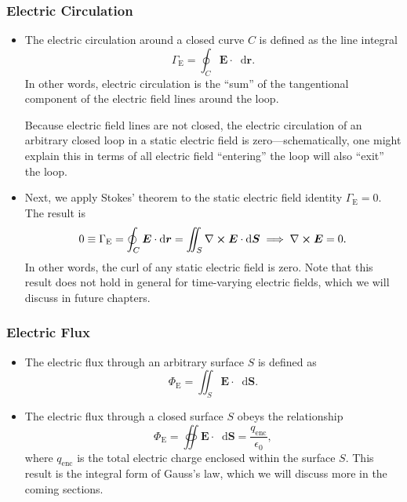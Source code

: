 \documentclass[11pt, a4paper]{article}
\newcommand{\diff}{\mathop{}\!\mathrm{d}} %
\renewcommand{\vec}[1]{\bm{#1}} %
\renewcommand{\r}{\vec{r}}
\newcommand{\E}{\vec{E}} %
\newcommand{\ee}{\epsilon_{0}}  %
\renewcommand{\curl}{\nabla \cross}
\begin{document}
\subsubsection{Electric Circulation}
\begin{itemize}
    \item The electric circulation around a closed curve $ C $ is defined as the line integral
    \begin{equation*}
        \Gamma_{\text{E}} = \oint_{C} \E \cdot \diff \r.
    \end{equation*}
    In other words, electric circulation is the ``sum'' of the tangentional component of the electric field lines around the loop.

    Because electric field lines are not closed, the electric circulation of an arbitrary closed loop in a static electric field is zero---schematically, one might explain this in terms of all electric field ``entering'' the loop will also ``exit'' the loop.

    \item Next, we apply Stokes' theorem to the static electric field identity $ \Gamma_{\text{E}} = 0 $. The result is
    \begin{equation*}
        0 \equiv \Gamma_{\text{E}} = \oint_{C}\E \cdot \diff \r = \iint_{S} \curl \E \cdot \diff \vec{S} \implies \curl \E = 0.
    \end{equation*}
    In other words, the curl of any static electric field is zero. Note that this result does not hold in general for time-varying electric fields, which we will discuss in future chapters. 

\end{itemize}

\subsubsection{Electric Flux}
\begin{itemize}
    \item The electric flux through an arbitrary surface $ S $ is defined as
    \begin{equation*}
        \Phi_{\text{E}} = \iint_{S} \E \cdot \diff \vec{S}.
    \end{equation*}

    \item The electric flux through a closed surface $ S $ obeys the relationship
    \begin{equation*}
        \Phi_{\text{E}} = \oiint \E \cdot \diff \vec{S} = \frac{q_{\text{enc}}}{\ee},
    \end{equation*}
    where $ q_{\text{enc}} $ is the total electric charge enclosed within the surface $ S $. This result is the integral form of Gauss's law, which we will discuss more in the coming sections.
    
    
    
\end{itemize}
\end{document}
